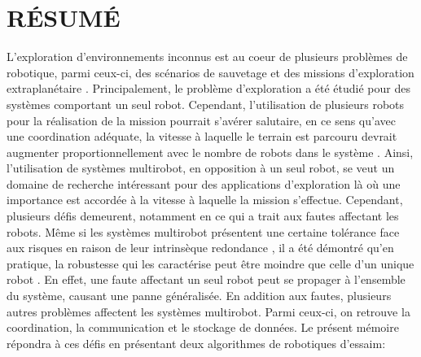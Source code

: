 

\chapter*{RÉSUMÉ}\thispagestyle{headings}

L'exploration d'environnements inconnus est au coeur de plusieurs problèmes de robotique, parmi ceux-ci, des scénarios de sauvetage \cite{matos2016multiple} et des missions d'exploration extraplanétaire \cite{fong2005interaction}. Principalement, le problème d'exploration a été étudié pour des systèmes comportant un seul robot. Cependant, l'utilisation de plusieurs robots pour la réalisation de la mission pourrait s'avérer salutaire, en ce sens qu'avec une coordination adéquate, la vitesse à laquelle le terrain est parcouru devrait augmenter proportionnellement avec le nombre de robots dans le système \cite{burgard2005coordinated}. Ainsi, l'utilisation de systèmes multirobot, en opposition à un seul robot, se veut un domaine de recherche intéressant pour des applications d'exploration là où une importance est accordée à la vitesse à laquelle la mission s'effectue. Cependant, plusieurs défis demeurent, notamment en ce qui a trait aux fautes affectant les robots. Même si les systèmes multirobot présentent une certaine tolérance face aux risques en raison de leur intrinsèque redondance \cite{ramachandran2019resilience,wehbe2021probabilistic,winfield2006safety}, il a été démontré qu'en pratique, la robustesse qui les caractérise peut être moindre que celle d'un unique robot \cite{winfield2006safety}. En effet, une faute affectant un seul robot peut se propager à l'ensemble du système, causant une panne généralisée. En addition aux fautes, plusieurs autres problèmes affectent les systèmes multirobot. Parmi ceux-ci, on retrouve la coordination, la communication et le stockage de données. Le présent mémoire répondra à ces défis en présentant deux algorithmes de robotiques d'essaim:

